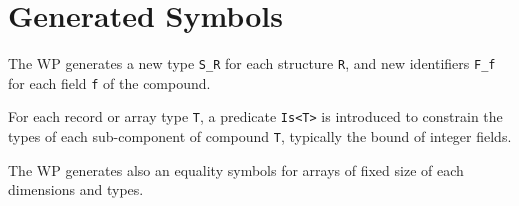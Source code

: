\section{Generated Symbols}

The \textsf{WP} generates a new type \verb+S_R+ for each structure \verb+R+, and
new identifiers \verb+F_f+ for each field \verb+f+ of the compound.

For each record or array type \verb+T+, a predicate \verb+Is<T>+ is
introduced to constrain the types of each sub-component of compound
\verb+T+, typically the bound of integer fields.

The \textsf{WP} generates also an equality symbols for arrays of fixed
size of each dimensions and types.
